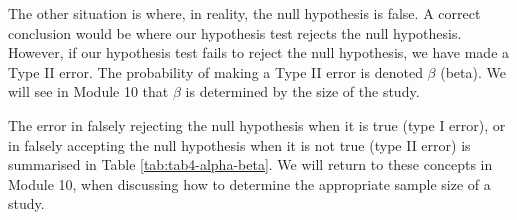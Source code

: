 \documentclass[
]{memoir}
\begin{document}
The other situation is where, in reality, the null hypothesis is false. A correct conclusion would be where our hypothesis test rejects the null hypothesis. However, if our hypothesis test fails to reject the null hypothesis, we have made a Type II error. The probability of making a Type II error is denoted \(\beta\) (beta). We will see in Module 10 that \(\beta\) is determined by the size of the study.

The error in falsely rejecting the null hypothesis when it is true (type I error), or in falsely accepting the null hypothesis when it is not true (type II error) is summarised in Table \ref{tab:tab4-alpha-beta}. We will return to these concepts in Module 10, when discussing how to determine the appropriate sample size of a study.

 
  \providecommand{\huxb}[2]{\arrayrulecolor[RGB]{#1}\global\arrayrulewidth=#2pt}
  \providecommand{\huxvb}[2]{\color[RGB]{#1}\vrule width #2pt}
  \providecommand{\huxtpad}[1]{\rule{0pt}{#1}}
  \providecommand{\huxbpad}[1]{\rule[-#1]{0pt}{#1}}
\end{document}
